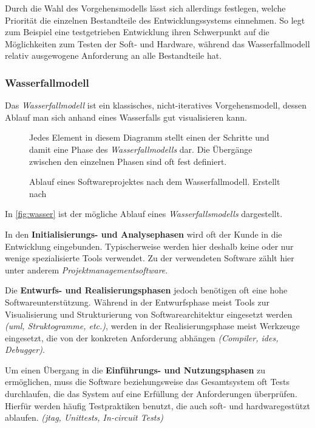 Durch die Wahl des Vorgehensmodells lässt sich allerdings festlegen, welche
Priorität die einzelnen Bestandteile des Entwicklungssystems einnehmen. So legt
zum Beispiel eine testgetrieben Entwicklung ihren Schwerpunkt auf die
Möglichkeiten zum Testen der Soft- und Hardware, während das Wasserfallmodell
relativ ausgewogene Anforderung an alle Bestandteile hat.

\subsubsection*{Wasserfallmodell}
Das \emph{Wasserfallmodell} ist ein klassisches, nicht-iteratives
Vorgehensmodell, dessen Ablauf man sich anhand eines Wasserfalls gut visualisieren kann. 

\begin{figure}[!ht]
\centering
\def\svgwidth{\columnwidth}

\caption{Ablauf eines Softwareprojektes nach dem Wasserfallmodell. Erstellt nach
\cite{WP01}}{Jedes Element in diesem Diagramm stellt einen der Schritte und
damit eine Phase des \emph{Wasserfallmodells} dar. Die Übergänge zwischen den
einzelnen Phasen sind oft fest definiert.}
\label{fig:wasser}
\end{figure}

In \autoref{fig:wasser} ist der mögliche Ablauf eines \emph{Wasserfallsmodells}
dargestellt.

In den \textbf{Initialisierungs- und Analysephasen} wird oft der Kunde in die
Entwicklung eingebunden. Typischerweise werden hier deshalb keine oder nur
wenige spezialisierte Tools verwendet. Zu der verwendeten Software zählt hier
unter anderem \emph{Projektmanagementsoftware}.

Die \textbf{Entwurfs- und Realisierungsphasen} jedoch benötigen oft eine hohe
Softwareunterstützung. Während in der Entwurfsphase meist Tools zur
Visualisierung und Strukturierung von Softwarearchitektur eingesetzt werden
\emph{(\gls{uml}, Struktogramme, etc.)}, werden in der Realisierungsphase
meist Werkzeuge eingesetzt, die von der konkreten Anforderung abhängen
\emph{(Compiler, \glspl{ide}, Debugger)}.

Um einen Übergang in die \textbf{Einführungs- und Nutzungsphasen} zu
ermöglichen, muss die Software beziehungsweise das Gesamtsystem oft Tests durchlaufen, die das
System auf eine Erfüllung der Anforderungen überprüfen. Hierfür werden
häufig Testpraktiken benutzt, die auch soft- und hardwaregestützt
ablaufen. \emph{(\gls{jtag}, Unittests, In-circuit Tests)}

